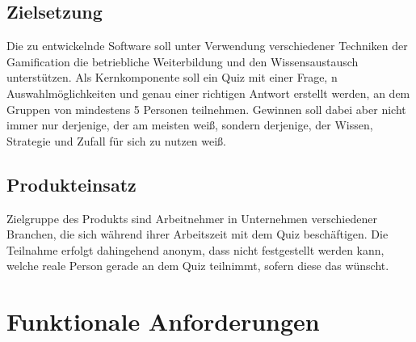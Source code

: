 \documentclass[11pt,a4paper]{scrreprt}
\begin{document}
\section{Zielsetzung}
Die zu entwickelnde Software soll unter Verwendung verschiedener Techniken der Gamification die betriebliche Weiterbildung und den Wissensaustausch unterstützen.
Als Kernkomponente soll ein Quiz mit einer Frage, n Auswahlmöglichkeiten und genau einer richtigen Antwort erstellt werden, an dem Gruppen von mindestens 5 Personen teilnehmen.
Gewinnen soll dabei aber nicht immer nur derjenige, der am meisten weiß, sondern derjenige, der Wissen, Strategie und Zufall für sich zu nutzen weiß.
\section{Produkteinsatz}
Zielgruppe des Produkts sind Arbeitnehmer in Unternehmen verschiedener Branchen, die sich während ihrer Arbeitszeit mit dem Quiz beschäftigen. Die Teilnahme erfolgt dahingehend anonym, dass nicht festgestellt werden kann, welche reale Person gerade an dem Quiz teilnimmt, sofern diese das wünscht.

\chapter{Funktionale Anforderungen}
\end{document}
